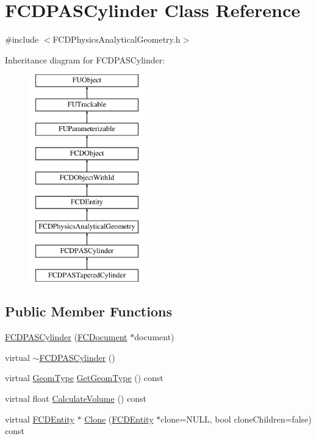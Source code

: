 \hypertarget{classFCDPASCylinder}{
\section{FCDPASCylinder Class Reference}
\label{classFCDPASCylinder}
}


{\ttfamily \#include $<$FCDPhysicsAnalyticalGeometry.h$>$}

Inheritance diagram for FCDPASCylinder:\begin{figure}[H]
\begin{center}
\leavevmode
\includegraphics[height=9.000000cm]{classFCDPASCylinder}
\end{center}
\end{figure}
\subsection*{Public Member Functions}
\begin{DoxyCompactItemize}
\item 
\hyperlink{classFCDPASCylinder_a678b7cc16e1e2a476aebb2899ab2d178}{FCDPASCylinder} (\hyperlink{classFCDocument}{FCDocument} $\ast$document)
\item 
virtual \hyperlink{classFCDPASCylinder_a8aafdffc070de8170008b24224f0f11c}{$\sim$FCDPASCylinder} ()
\item 
virtual \hyperlink{classFCDPhysicsAnalyticalGeometry_a511583406e5c6a1bb5bd84c0453a452c}{GeomType} \hyperlink{classFCDPASCylinder_a2c13420ee5b1dbb527dbd15043a9cc09}{GetGeomType} () const 
\item 
virtual float \hyperlink{classFCDPASCylinder_a20e4055372f2a805dff71d560246f212}{CalculateVolume} () const 
\item 
virtual \hyperlink{classFCDEntity}{FCDEntity} $\ast$ \hyperlink{classFCDPASCylinder_a9f398013a3fd84fa83c4da99ca4b7c25}{Clone} (\hyperlink{classFCDEntity}{FCDEntity} $\ast$clone=NULL, bool cloneChildren=false) const 
\end{DoxyCompactItemize}
